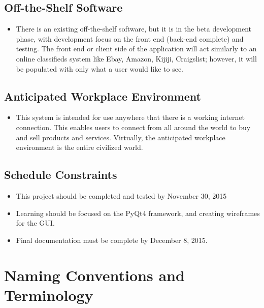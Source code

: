 \documentclass{article}
\begin{document}
\subsection{Off-the-Shelf Software}
\begin{itemize}
        
\item
There is an existing off-the-shelf software, but it is in the beta development phase, with development focus on the front end (back-end complete) and testing. The front end or client side of the application will act similarly to an online classifieds system like Ebay, Amazon, Kijiji, Craigslist; however, it will be populated with only what a user would like to see. 
        
\end{itemize}
\subsection{Anticipated Workplace Environment}
\begin{itemize}
        
\item
This system is intended for use anywhere that there is a working internet connection. This enables users to connect from all around the world to buy and sell products and services. Virtually, the anticipated workplace environment is the entire civilized world.
        
        
\end{itemize}
\subsection{Schedule Constraints}
\begin{itemize}
        
\item
This project should be completed and tested by November 30, 2015
\item
Learning should be focused on the PyQt4 framework, and creating wireframes for the GUI.
\item
Final documentation must be complete by December 8, 2015.
        
\end{itemize}
\section{Naming Conventions and Terminology}
\end{document}
